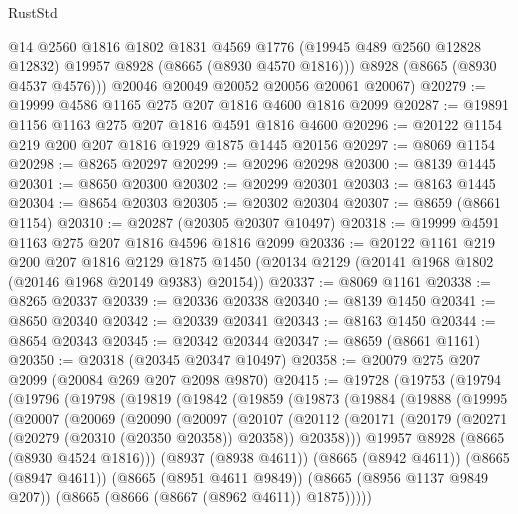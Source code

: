 \begin{lexlean}{RustStd}
\begin{coremodule}
          @14
          @2560
          @1816
          @1802
          @1831
          @4569
          @1776
          (@19945 @489 @2560 @12828 @12832)
          @19957
          @8928
          (@8665 (@8930 @4570 @1816)))
        @8928
        (@8665 (@8930 @4537 @4576)))
      @20046
      @20049
      @20052
      @20056
      @20061
      @20067)
@20279 := @19999 @4586 @1165 @275 @207 @1816 @4600 @1816 @2099
@20287 := @19891 @1156 @1163 @275 @207 @1816 @4591 @1816 @4600
@20296 := @20122 @1154 @219 @200 @207 @1816 @1929 @1875 @1445 @20156
@20297 := @8069 @1154
@20298 := @8265 @20297
@20299 := @20296 @20298
@20300 := @8139 @1445
@20301 := @8650 @20300
@20302 := @20299 @20301
@20303 := @8163 @1445
@20304 := @8654 @20303
@20305 := @20302 @20304
@20307 := @8659 (@8661 @1154)
@20310 := @20287 (@20305 @20307 @10497)
@20318 := @19999 @4591 @1163 @275 @207 @1816 @4596 @1816 @2099
@20336 := @20122
    @1161
    @219
    @200
    @207
    @1816
    @2129
    @1875
    @1450
    (@20134 @2129 (@20141 @1968 @1802 (@20146 @1968 @20149 @9383) @20154))
@20337 := @8069 @1161
@20338 := @8265 @20337
@20339 := @20336 @20338
@20340 := @8139 @1450
@20341 := @8650 @20340
@20342 := @20339 @20341
@20343 := @8163 @1450
@20344 := @8654 @20343
@20345 := @20342 @20344
@20347 := @8659 (@8661 @1161)
@20350 := @20318 (@20345 @20347 @10497)
@20358 := @20079 @275 @207 @2099 (@20084 @269 @207 @2098 @9870)
@20415 := @19728
    (@19753
      (@19794
        (@19796
          (@19798
            (@19819
              (@19842
                (@19859
                  (@19873
                    (@19884
                      (@19888
                        (@19995
                          (@20007
                            (@20069
                              (@20090
                                (@20097
                                  (@20107
                                    (@20112
                                      (@20171
                                        (@20179
                                          (@20271 (@20279 (@20310 (@20350 @20358)) @20358))
                                          @20358)))
                                    @19957
                                    @8928
                                    (@8665 (@8930 @4524 @1816)))
                                  (@8937 (@8938 @4611))
                                  (@8665 (@8942 @4611))
                                  (@8665 (@8947 @4611))
                                  (@8665 (@8951 @4611 @9849))
                                  (@8665 (@8956 @1137 @9849 @207))
                                  (@8665 (@8666 (@8667 (@8962 @4611)) @1875)))))

\end{coremodule}
\end{lexlean}
